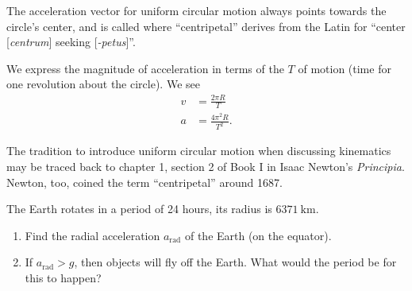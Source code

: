 The acceleration vector for uniform circular motion always points
towards the circle's center, and is called 
where ``centripetal'' derives from the Latin for ``center
[\emph{centrum}] seeking [\emph{-petus}]''.

We express the magnitude of acceleration in terms of the
$T$ of motion (time for one revolution about the circle). We see
\begin{subequations}
\begin{align}
v &= \frac{2\pi R}{T}\\
a &=\frac{4\pi^{2}R}{T^{2}}.
\end{align}
\end{subequations}

\begin{remark}
The tradition to introduce uniform circular motion when discussing
kinematics may be traced back to chapter 1, section 2 of
Book I in Isaac Newton's \emph{Principia}. Newton, too, coined the term
``centripetal'' around 1687.
\end{remark}

\workedExamples{}

The Earth rotates in a period of 24 hours, its radius is
$\SI{6371}{\kilo\meter}$. 
\begin{enumerate}
\item Find the radial acceleration $a_{\text{rad}}$ of the Earth (on the
  equator).
\item If $a_{\text{rad}}>g$, then objects will fly off the Earth. What
  would the period be for this to happen?
\end{enumerate}

